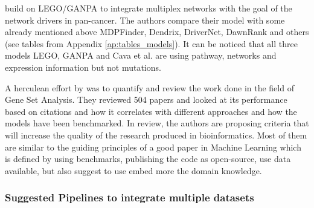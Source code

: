 \citet{Cava2018-rv} build on LEGO/GANPA to integrate multiplex networks with the goal of the network drivers in pan-cancer. The authors compare their model with some already mentioned above MDPFinder\cite{Zhao2012-wj}, Dendrix\cite{Vandin2012-cf}, DriverNet\cite{Bashashati2012-lk}, DawnRank\cite{Hou2014-se} and others (see tables from Appendix \cref{ap:tables_models}). It can be noticed that all three models LEGO, GANPA and Cava et al. are using pathway, networks and expression information but not mutations.



A herculean effort by \citet{Xie2021-al} was to quantify and review the work done in the field of Gene Set Analysis. They reviewed 504 papers and looked at its performance based on citations and how it correlates with different approaches and how the models have been benchmarked. In review, the authors are proposing criteria that will increase the quality of the research produced in bioinformatics. Most of them are similar to the guiding principles of a good paper in Machine Learning which is defined by using benchmarks, publishing the code as open-source, use data available, but also suggest to use embed more the domain knowledge.


\subsubsection*{Suggested Pipelines to integrate multiple datasets} \label{s:pipelines}


